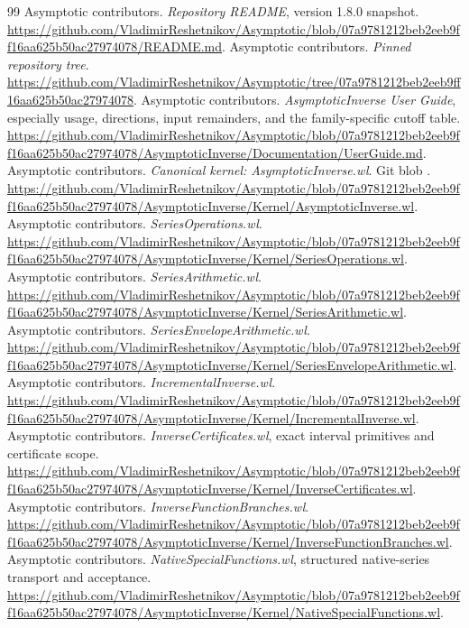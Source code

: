 \documentclass[11pt,letterpaper]{article}
\newcommand{\code}[1]{\texttt{\detokenize{#1}}}
\begin{document}
\clearpage
\begin{thebibliography}{99}
\small
{} Asymptotic contributors. \emph{Repository README}, version 1.8.0 snapshot. \url{https://github.com/VladimirReshetnikov/Asymptotic/blob/07a9781212beb2eeb9ff16aa625b50ac27974078/README.md}.
 Asymptotic contributors. \emph{Pinned repository tree}. \url{https://github.com/VladimirReshetnikov/Asymptotic/tree/07a9781212beb2eeb9ff16aa625b50ac27974078}.
 Asymptotic contributors. \emph{AsymptoticInverse User Guide}, especially usage, directions, input remainders, and the family-specific cutoff table. \url{https://github.com/VladimirReshetnikov/Asymptotic/blob/07a9781212beb2eeb9ff16aa625b50ac27974078/AsymptoticInverse/Documentation/UserGuide.md}.
 Asymptotic contributors. \emph{Canonical kernel: AsymptoticInverse.wl}. Git blob \code{ea9eaf4a11130e922ac4fb3faae37fd8e8d29643}. \url{https://github.com/VladimirReshetnikov/Asymptotic/blob/07a9781212beb2eeb9ff16aa625b50ac27974078/AsymptoticInverse/Kernel/AsymptoticInverse.wl}.
 Asymptotic contributors. \emph{SeriesOperations.wl}. \url{https://github.com/VladimirReshetnikov/Asymptotic/blob/07a9781212beb2eeb9ff16aa625b50ac27974078/AsymptoticInverse/Kernel/SeriesOperations.wl}.
 Asymptotic contributors. \emph{SeriesArithmetic.wl}. \url{https://github.com/VladimirReshetnikov/Asymptotic/blob/07a9781212beb2eeb9ff16aa625b50ac27974078/AsymptoticInverse/Kernel/SeriesArithmetic.wl}.
 Asymptotic contributors. \emph{SeriesEnvelopeArithmetic.wl}. \url{https://github.com/VladimirReshetnikov/Asymptotic/blob/07a9781212beb2eeb9ff16aa625b50ac27974078/AsymptoticInverse/Kernel/SeriesEnvelopeArithmetic.wl}.
 Asymptotic contributors. \emph{IncrementalInverse.wl}. \url{https://github.com/VladimirReshetnikov/Asymptotic/blob/07a9781212beb2eeb9ff16aa625b50ac27974078/AsymptoticInverse/Kernel/IncrementalInverse.wl}.
 Asymptotic contributors. \emph{InverseCertificates.wl}, exact interval primitives and certificate scope. \url{https://github.com/VladimirReshetnikov/Asymptotic/blob/07a9781212beb2eeb9ff16aa625b50ac27974078/AsymptoticInverse/Kernel/InverseCertificates.wl}.
 Asymptotic contributors. \emph{InverseFunctionBranches.wl}. \url{https://github.com/VladimirReshetnikov/Asymptotic/blob/07a9781212beb2eeb9ff16aa625b50ac27974078/AsymptoticInverse/Kernel/InverseFunctionBranches.wl}.
 Asymptotic contributors. \emph{NativeSpecialFunctions.wl}, structured native-series transport and acceptance. \url{https://github.com/VladimirReshetnikov/Asymptotic/blob/07a9781212beb2eeb9ff16aa625b50ac27974078/AsymptoticInverse/Kernel/NativeSpecialFunctions.wl}.

\end{thebibliography}
\end{document}
